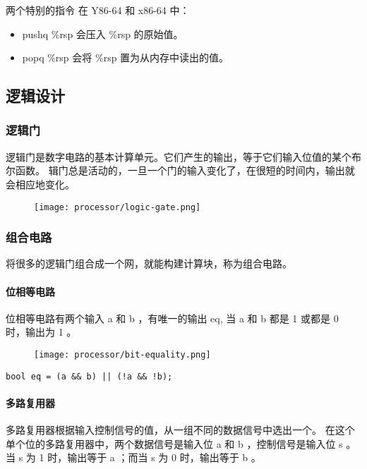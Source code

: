 \begin{sidenote}{两个特别的指令}
    在 Y86-64 和 x86-64 中：
    \begin{itemize}
        \item pushq \%rsp 会压入 \%rsp 的原始值。
        \item popq \%rsp 会将 \%rsp 置为从内存中读出的值。
    \end{itemize}
\end{sidenote}

\subsection{逻辑设计}

\subsubsection{逻辑门}
逻辑门是数字电路的基本计算单元。它们产生的输出，等于它们输入位值的某个布尔函数。
辑门总是活动的，一旦一个门的输入变化了，在很短的时间内，输出就会相应地变化。
\begin{figure}[H]
    \centering
    \texttt{[image: processor/logic-gate.png]}
\end{figure}
\subsubsection{组合电路}

将很多的逻辑门组合成一个网，就能构建计算块，称为组合电路。

\paragraph{位相等电路}

位相等电路有两个输入 a 和 b ，有唯一的输出 eq, 当 a 和 b 都是 1 或都是 0 时，输出为 1 。

\begin{figure}[H]
    \centering
    \texttt{[image: processor/bit-equality.png]}
\end{figure}
\begin{lstlisting}[style=CStyle]
bool eq = (a && b) || (!a && !b);
\end{lstlisting}

\paragraph{多路复用器}
多路复用器根据输入控制信号的值，从一组不同的数据信号中选出一个。
在这个单个位的多路复用器中，两个数据信号是输入位 a 和 b ，控制信号是输入位 s 。
当 s 为 1 时，输出等于 a ；而当 s 为 0 时，输出等于 b 。

